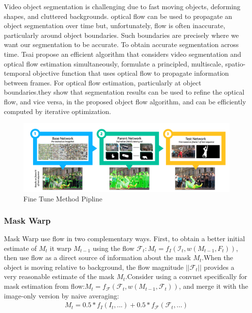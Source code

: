 Video object segmentation is challenging due to fast moving objects, deforming shapes, and cluttered backgrounds. optical flow can be used to propagate an object segmentation over time but, unfortunately, flow is often inaccurate, particularly around object boundaries. Such boundaries are precisely where we want our segmentation to be accurate. To obtain accurate segmentation across time.  Tsai \etal propose an efficient algorithm\cite{OFL}  that considers video segmentation and optical flow estimation simultaneously, formulate a principled, multiscale, spatio-temporal objective function that uses optical flow to propagate information between frames. For optical flow estimation, particularly at object boundaries.they show that segmentation results can be used to refine the optical flow, and vice versa, in the proposed object flow algorithm, and can be efficiently computed by iterative optimization.


\begin{figure}
    \begin{center}
        \includegraphics[width=\textwidth]{figure/fine_tune.png}
    \end{center}
    \caption{Fine Tune Method Pipline}
    \label{fine_tune}
\end{figure}


\subsubsection{Mask Warp}
Mask Warp\cite{LucidTracker} use flow in two complementary ways. First, to obtain a better initial estimate of $M_t$ it warp $M_{t−1}$ using the flow $\mathcal{F}_t : M_t = f_I (\mathcal{I}_t , w(M_{t-1} , F_{t}))$, then use flow as a direct source of information about the mask $M_t$.When the object is moving relative to background, the flow magnitude $||\mathcal{F}_t||$ provides a very reasonable estimate of the mask $M_t$.Consider using a convnet specifically for mask estimation from flow:$M_t = f_{\mathcal{F}} (\mathcal{F}_t , w(M_{t-1} , \mathcal{F}_t))$, and merge it with the image-only version by naive averaging:
\begin{align*}
    M_t = 0.5 * f_I(I_t, ...) + 0.5 * f_\mathcal{F}(\mathcal{F}_t, ...)
\end{align*}

